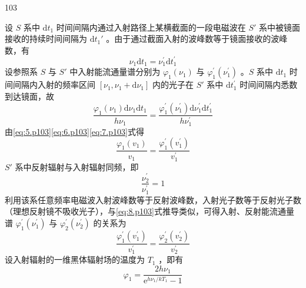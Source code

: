 \begin{solution}{103}
\begin{subsolution}
        设 $S$ 系中 $\mathrm{d}t_{1}$ 时间间隔内通过入射路径上某横截面的一段电磁波在 $S'$ 系中被镜面接收的持续时间间隔为 $\mathrm{d}t_{1}'$ 。由于通过截面入射的波峰数等于镜面接收的波峰数，有
        \begin{equation}
            \nu_ {1} \mathrm{d} t _ {1} = \nu_ {1} ^ {\prime} \mathrm{d} t _ {1} ^ {\prime}
            \label{eq:6.p103}
        \end{equation}
        设参照系 $S$ 与 $S'$ 中入射能流通量谱分别为 $\varphi_{1}\left(\nu_{1}\right)$ 与 $\varphi_{1}^{\prime}\left(\nu_{1}^{\prime}\right)$ 。$S$ 系中 $\mathrm{d}t_{1}$ 时间间隔内入射的频率区间 $\left[\nu_{1},\nu_{1}+\mathrm{d}\nu_{1}\right]$ 内的光子在 $S'$ 系中 $\mathrm{d}t_{1}^{\prime}$ 时间间隔内悉数到达镜面，故
        \begin{equation}
            \frac {\varphi_ {1} \left(\nu_ {1}\right) \mathrm{d} \nu_ {1} \mathrm{d} t _ {1}}{h \nu_ {1}} = \frac {\varphi_ {1} ^ {\prime} \left(\nu_ {1} ^ {\prime}\right) \mathrm{d} \nu_ {1} ^ {\prime} \mathrm{d} t _ {1} ^ {\prime}}{h \nu_ {1} ^ {\prime}}
            \label{eq:7.p103}
        \end{equation}
        由\eqref{eq:5.p103}\eqref{eq:6.p103}\eqref{eq:7.p103}式得
        \begin{equation}
            \frac {\varphi_ {1} \left(v _ {1}\right)}{v _ {1}} = \frac {\varphi_ {1} ^ {\prime} \left(v _ {1} ^ {\prime}\right)}{v _ {1} ^ {\prime}}
            \label{eq:8.p103}
        \end{equation}
        $S'$ 系中反射辐射与入射辐射同频，即
        \begin{equation}
            \frac {\nu_ {2} ^ {\prime}}{\nu_ {1} ^ {\prime}} = 1
            \label{eq:9.p103}
        \end{equation}
        利用该系任意频率电磁波入射波峰数等于反射波峰数，入射光子数等于反射光子数（理想反射镜不吸收光子），与\eqref{eq:8.p103}式推导类似，可得入射、反射能流通量谱 $\varphi_{1}^{\prime}\left(\nu_{1}^{\prime}\right)$ 与 $\varphi_{2}^{\prime}\left(\nu_{2}^{\prime}\right)$ 的关系为
        \begin{equation}
            \frac {\varphi_ {1} ^ {\prime} \left(v _ {1} ^ {\prime}\right)}{v _ {1} ^ {\prime}} = \frac {\varphi_ {2} ^ {\prime} \left(v _ {2} ^ {\prime}\right)}{v _ {2} ^ {\prime}}
            \label{eq:10.p103}
        \end{equation}
        设入射辐射的一维黑体辐射场的温度为 $T_{1}$ ，即有
        \begin{equation}
            \varphi_ {1} = \frac {2 h \nu_ {1}}{\mathrm{e} ^ {h \nu_ {1} / k T _ {1}} - 1}

\end{equation}
\end{subsolution}
\end{solution}
